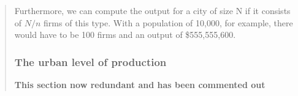 \begin{enumerate}
\begin{quotation}

Furthermore, we can compute the output for a city of size N if it consists of $N/n$ firms of this type. With a population of 10,000, for example,  there would have to be  100 firms and an output of \$555,555,600. 

 \subsubsection{The urban level of production}
 \textbf{This section now redundant and has been commented out}








\end{quotation}
\end{enumerate}
